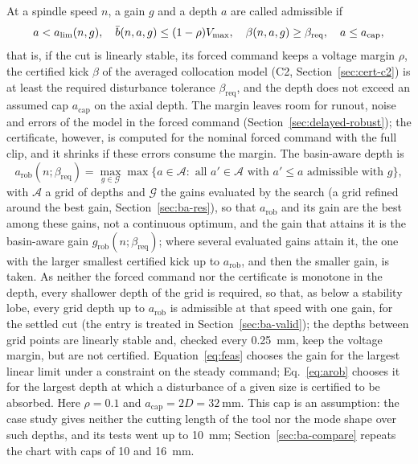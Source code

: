 At a spindle speed $n$, a gain $g$ and a depth $a$ are called admissible if
\begin{equation}\label{eq:admissible}
  a<a_{\lim}(n,g),\quad \bar b(n,a,g)\le(1-\rho)V_{\max},\quad \beta(n,a,g)\ge\beta_{\mathrm{req}},\quad a\le a_{\mathrm{cap}},
\end{equation}
that is, if the cut is linearly stable, its forced command keeps a voltage margin $\rho$, the certified kick $\beta$ of the averaged collocation model (C2, Section~\ref{sec:cert-c2}) is at least the required disturbance tolerance $\beta_{\mathrm{req}}$, and the depth does not exceed an assumed cap $a_{\mathrm{cap}}$ on the axial depth. The margin leaves room for runout, noise and errors of the model in the forced command (Section~\ref{sec:delayed-robust}); the certificate, however, is computed for the nominal forced command with the full clip, and it shrinks if these errors consume the margin. The basin-aware depth is
\begin{equation}\label{eq:arob}
  a_{\mathrm{rob}}(n;\beta_{\mathrm{req}})=\max_{g\in\mathcal G}\max\bigl\{a\in\mathcal A:\text{ all }a'\in\mathcal A\text{ with }a'\le a\text{ admissible with }g\bigr\},
\end{equation}
with $\mathcal A$ a grid of depths and $\mathcal G$ the gains evaluated by the search (a grid refined around the best gain, Section~\ref{sec:ba-res}), so that $a_{\mathrm{rob}}$ and its gain are the best among these gains, not a continuous optimum, and the gain that attains it is the basin-aware gain $g_{\mathrm{rob}}(n;\beta_{\mathrm{req}})$; where several evaluated gains attain it, the one with the larger smallest certified kick up to $a_{\mathrm{rob}}$, and then the smaller gain, is taken. As neither the forced command nor the certificate is monotone in the depth, every shallower depth of the grid is required, so that, as below a stability lobe, every grid depth up to $a_{\mathrm{rob}}$ is admissible at that speed with one gain, for the settled cut (the entry is treated in Section~\ref{sec:ba-valid}); the depths between grid points are linearly stable and, checked every \SI{0.25}{\milli\metre}, keep the voltage margin, but are not certified. Equation~\eqref{eq:feas} chooses the gain for the largest linear limit under a constraint on the steady command; Eq.~\eqref{eq:arob} chooses it for the largest depth at which a disturbance of a given size is certified to be absorbed. Here $\rho=0.1$ and $a_{\mathrm{cap}}=2D=\SI{32}{\milli\metre}$. This cap is an assumption: the case study gives neither the cutting length of the tool nor the mode shape over such depths, and its tests went up to \SI{10}{\milli\metre}; Section~\ref{sec:ba-compare} repeats the chart with caps of 10 and \SI{16}{\milli\metre}.

